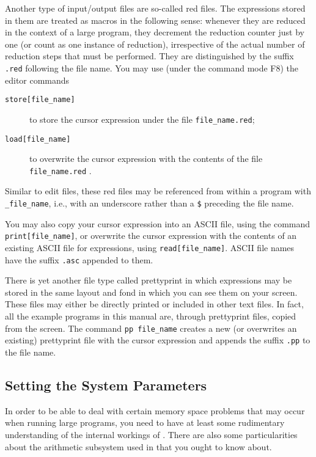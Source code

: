Another type of input/output files are so-called
{\mys red files}. The \kir expressions stored in them are treated as 
{\mys macros} in the following sense: whenever they are reduced in the 
context of a large program, they decrement the {\mys reduction counter}
just by one (or count as one instance of reduction), irrespective of the
actual number of reduction steps that must 
be performed. They are distinguished by the suffix {\tt .red} 
following the file name. You may use (under the command mode F8) 
the {\mys editor commands}
\begin{description}
\item[{\tt store[file\_name]}] to store the cursor expression under
the file {\tt file\_name.red};
\item[{\tt load[file\_name]}] to  overwrite the cursor expression with
 the contents of the file {\tt file\_name.red} .
\end{description}
Similar to edit files, these red files may be referenced from within a
 program with
{\tt \_file\_name}, i.e., with an underscore rather than a {\tt \$}
preceding the file name.

You may also copy your cursor expression into an {\mys ASCII file}, using the
command {\tt print[file\_name]}, or overwrite the cursor expression with
the contents of an existing ASCII file for \kir expressions, using
{\tt read[file\_name]}. ASCII file names have the suffix {\tt .asc}
appended to them.

There is yet another file type called {\mys prettyprint} in  which 
\kir expressions may be stored in the same layout and fond in which
you can see them on your screen. These files may either be directly
printed or included in other text files. In fact, all the example programs  
in this manual are, through prettyprint files, copied from the 
screen.  The command {\tt pp file\_name} creates a new (or overwrites
an existing) prettyprint file with the cursor expression and appends the
suffix {\tt .pp} to the file name.

\subsection{Setting the System Parameters}

In order to be able to deal with certain {\mys memory space problems}
that may occur when running large programs, you need to have at least 
some rudimentary understanding of the internal workings of \pired.
There are also some particularities about the {\mys arithmetic subsystem} 
 used in \pired that you ought to know about. 

